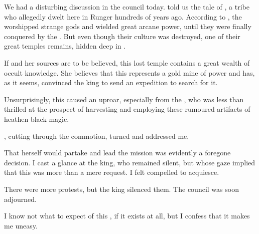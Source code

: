 \begin{diary}%
\diarystamp{\dateTakestshaIntroducesEreshKal}

\new
We had a disturbing discussion in the council today. \Miss{} \Takestsha{} told us the tale of , a  tribe who allegedly dwelt here in Runger hundreds of years ago. According to \Takestsha, the \EreshKali{} worshipped strange gods and wielded great arcane power, until they were finally conquered by the  \humans. But even though their culture was destroyed, one of their great temples remains, hidden deep in .

If \Takestsha{} and her sources are to be believed, this lost temple contains a great wealth of occult knowledge. She believes that this represents a gold mine of power and has, as it seems, convinced the king to send an expedition to search for it. 

Unsurprisingly, this caused an uproar, especially from the \pater, who was less than thrilled at the prospect of harvesting and employing these rumoured artifacts of heathen black magic. 

\Takestsha{}, cutting through the commotion,  turned and addressed me.  

That \Takestsha{} herself would partake and lead the mission was evidently a foregone decision. I cast a glance at the king, who remained silent, but whose gaze implied that this was more than a mere request. I felt compelled to acquiesce. 

There were more protests, but the king silenced them. The council was soon adjourned. 

I know not what to expect of this \EreshKal, if it exists at all, but I confess that it makes me uneasy.
% 
% 
% 
% 
%
\end{diary}









